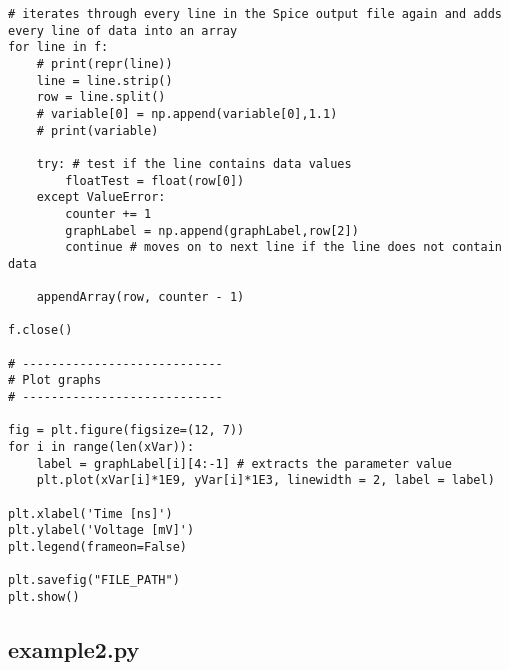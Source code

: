 \begin{lstlisting}
# iterates through every line in the Spice output file again and adds every line of data into an array
for line in f:
    # print(repr(line))
    line = line.strip()
    row = line.split()
    # variable[0] = np.append(variable[0],1.1)
    # print(variable)

    try: # test if the line contains data values
        floatTest = float(row[0])
    except ValueError:
        counter += 1
        graphLabel = np.append(graphLabel,row[2])
        continue # moves on to next line if the line does not contain data

    appendArray(row, counter - 1)

f.close()

# ----------------------------
# Plot graphs
# ----------------------------

fig = plt.figure(figsize=(12, 7))
for i in range(len(xVar)):
    label = graphLabel[i][4:-1] # extracts the parameter value
    plt.plot(xVar[i]*1E9, yVar[i]*1E3, linewidth = 2, label = label)

plt.xlabel('Time [ns]')
plt.ylabel('Voltage [mV]')
plt.legend(frameon=False)

plt.savefig("FILE_PATH")
plt.show()

\end{lstlisting}

\subsection{example2.py}

